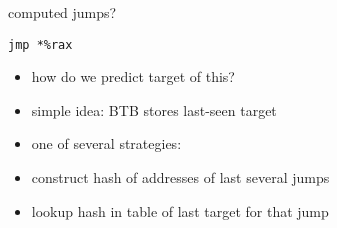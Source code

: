 \begin{frame}[fragile]{computed jumps?}
\begin{lstlisting}
jmp *%rax
\end{lstlisting}
    \begin{itemize}
        \item how do we predict target of this?
        \item simple idea: BTB stores last-seen target
        \item one of several strategies:
        \vspace{.5cm}
        \item construct hash of addresses of last several jumps
        \item lookup hash in table of last target for that jump
    \end{itemize}
\end{frame}
